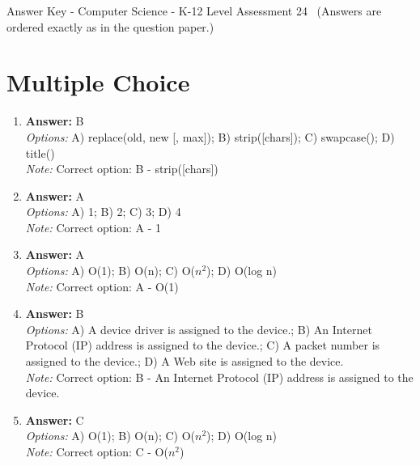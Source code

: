 \documentclass[12pt]{article}
\begin{document}
\begin{center}
Answer Key - Computer Science - K-12 Level Assessment 24 \
\small (Answers are ordered exactly as in the question paper.)
\end{center}

\section*{Multiple Choice}
\begin{enumerate}[label=\arabic*.]
\item \textbf{Answer:} B
\\ \textit{Options:} A) replace(old, new [, max]); B) strip([chars]); C) swapcase(); D) title()
\\ \textit{Note:} Correct option: B - strip([chars])
\item \textbf{Answer:} A
\\ \textit{Options:} A) 1; B) 2; C) 3; D) 4
\\ \textit{Note:} Correct option: A - 1
\item \textbf{Answer:} A
\\ \textit{Options:} A) O(1); B) O(n); C) O($n^2$); D) O(log n)
\\ \textit{Note:} Correct option: A - O(1)
\item \textbf{Answer:} B
\\ \textit{Options:} A) A device driver is assigned to the device.; B) An Internet Protocol (IP) address is assigned to the device.; C) A packet number is assigned to the device.; D) A Web site is assigned to the device.
\\ \textit{Note:} Correct option: B - An Internet Protocol (IP) address is assigned to the device.
\item \textbf{Answer:} C
\\ \textit{Options:} A) O(1); B) O(n); C) O($n^2$); D) O(log n)
\\ \textit{Note:} Correct option: C - O($n^2$)
\end{enumerate}
\end{document}
